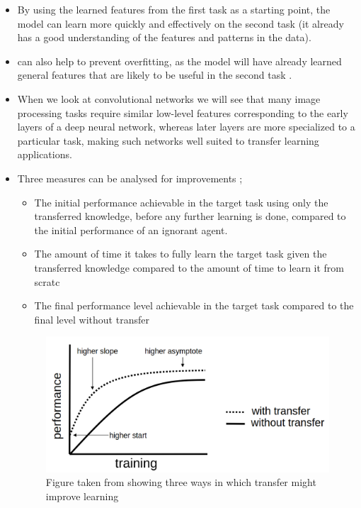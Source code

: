 \documentclass[11pt]{article}
\begin{document}
\begin{itemize}
    \item By using the learned features from the first task as a starting point, the model can learn more quickly and effectively on the second task \cite{geeks-transfer-learning} (it already has a good understanding of the features and patterns in the data).
    \item can also help to prevent overfitting, as the model will have already learned general features that are likely to be useful in the second task \cite{geeks-transfer-learning}.
    \item When we look at convolutional networks we will see that many image processing tasks require similar low-level features corresponding to the early layers of a deep neural network, whereas later layers are more specialized to a particular task, making such networks well suited to transfer learning applications. \cite{deep-learning-book}
    \item Three measures can be analysed for improvements \cite{torrey-handbook};

          \begin{itemize}
              \item The initial performance achievable in the target task using only the transferred knowledge, before any further learning is done, compared to the initial performance of an ignorant agent.
              \item The amount of time it takes to fully learn the target task given the transferred knowledge compared to the amount of time to learn it from scratc
              \item The final performance level achievable in the target task compared to the final level
                    without transfer
          \end{itemize}

          \begin{figure}[H]
              \centering
              \includegraphics[width=0.7\linewidth]{images/performance.png}
              \caption{Figure taken from \cite{torrey-handbook} showing three ways in which transfer might improve learning}
              \label{fig:performance}
          \end{figure}


\end{itemize}
\end{document}
